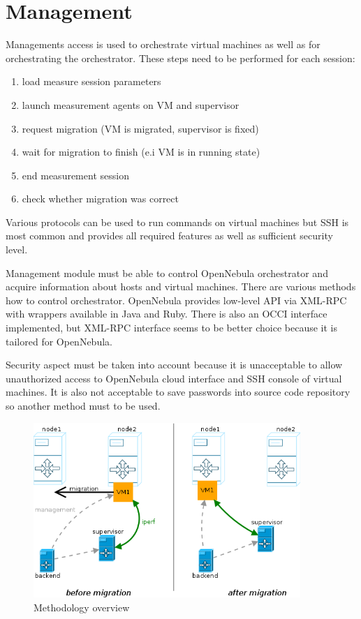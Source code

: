 \section{Management}
Managements access is used to orchestrate virtual machines as well as for orchestrating the orchestrator. These steps need to be performed for each session: 
\begin{enumerate}
	\item load measure session parameters
	\item launch measurement agents on \Ac{VM} and supervisor
	\item request migration (\Ac{VM} is migrated, supervisor is fixed)
	\item wait for migration to finish (e.i \Ac{VM} is in running state)
	\item end measurement session
	\item check whether migration was correct
\end{enumerate}

Various protocols can be used to run commands on virtual machines but \Ac{SSH} is most common and provides all required features as well as sufficient security level. 

Management module must be able to control OpenNebula orchestrator and acquire information about hosts and virtual machines. There are various methods how to control orchestrator. OpenNebula provides low-level \Ac{API} via \Ac{XML}-\Ac{RPC} with wrappers available in Java and Ruby. There is also an \Ac{OCCI} interface implemented, but \Ac{XML}-\Ac{RPC} interface seems to be better choice because it is tailored for OpenNebula.

Security aspect must be taken into account because it is unacceptable to allow unauthorized access to OpenNebula cloud interface and \Ac{SSH} console of virtual machines. It is also not acceptable to save passwords into source code repository so another method must to be used. 

\begin{figure}[htb]
	\begin{center}
	\includegraphics[width=0.9\textwidth]{methodology.png}
	\end{center}
	\caption{Methodology overview}
	\label{img:methodology}
\end{figure}


